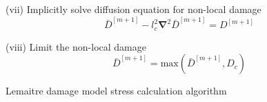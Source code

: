 \documentclass[sn-mathphys,Numbered,draft]{sn-jnl}%
\newcommand{\bb}{\boldsymbol}
\begin{document}
\begin{algorithm}[htbp]
(vii) Implicitly solve diffusion equation for non-local damage
\begin{equation}
	\bar{D}^{[m+1]} -  l_c^2 \bb{\nabla}^2 \bar{D}^{[m+1]} = D^{[m+1]}
\end{equation}

(viii) Limit the non-local damage
\begin{equation}
	\bar{D}^{[m+1]} = \text{max} \left( \bar{D}^{[m+1]} , D_c \right)
\end{equation}

\caption{Lemaitre damage model stress calculation algorithm}
\end{algorithm}
\normalsize

\end{document}

